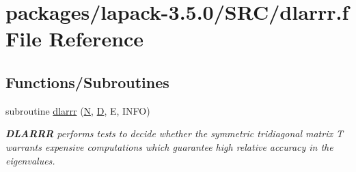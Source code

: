 \hypertarget{dlarrr_8f}{}\section{packages/lapack-\/3.5.0/\+S\+R\+C/dlarrr.f File Reference}
\label{dlarrr_8f}
\subsection*{Functions/\+Subroutines}
\begin{DoxyCompactItemize}
\item 
subroutine \hyperlink{group__auxOTHERauxiliary_gafe58120dedcb8d85c7a689c2d822f4a6}{dlarrr} (\hyperlink{polmisc_8c_a0240ac851181b84ac374872dc5434ee4}{N}, \hyperlink{odrpack_8h_a7dae6ea403d00f3687f24a874e67d139}{D}, E, I\+N\+F\+O)
\begin{DoxyCompactList}\small\item\em {\bfseries D\+L\+A\+R\+R\+R} performs tests to decide whether the symmetric tridiagonal matrix T warrants expensive computations which guarantee high relative accuracy in the eigenvalues. \end{DoxyCompactList}\end{DoxyCompactItemize}
